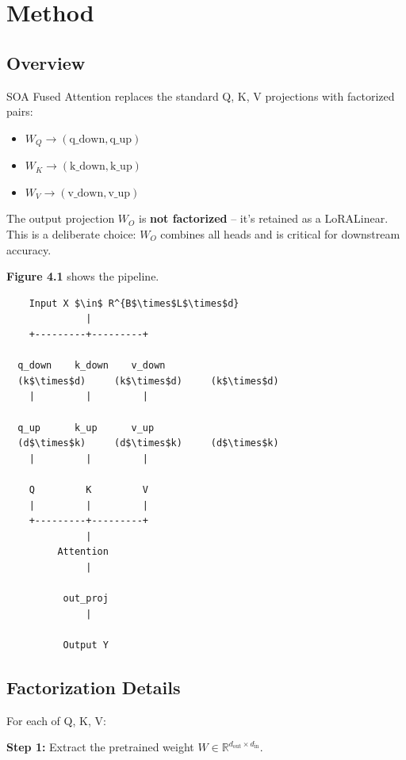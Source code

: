 \section{Method}

\subsection{Overview}

SOA Fused Attention replaces the standard Q, K, V projections with 
factorized pairs:

\begin{itemize}
\item $W_Q \to (\text{q\_down}, \text{q\_up})$
\item $W_K \to (\text{k\_down}, \text{k\_up})$
\item $W_V \to (\text{v\_down}, \text{v\_up})$

\end{itemize}
The output projection $W_O$ is \textbf{not factorized} -- it's retained as a 
LoRALinear. This is a deliberate choice: $W_O$ combines all heads and is 
critical for downstream accuracy.

\textbf{Figure 4.1} shows the pipeline.

\begin{lstlisting}
    Input X $\in$ R^{B$\times$L$\times$d}
              |
    +---------+---------+
                         
  q_down    k_down    v_down
  (k$\times$d)     (k$\times$d)     (k$\times$d)
    |         |         |
                         
  q_up      k_up      v_up
  (d$\times$k)     (d$\times$k)     (d$\times$k)
    |         |         |
                         
    Q         K         V
    |         |         |
    +---------+---------+
              |
         Attention
              |
               
          out_proj
              |
               
          Output Y
\end{lstlisting}

\subsection{Factorization Details}

For each of Q, K, V:

\textbf{Step 1:} Extract the pretrained weight $W \in \mathbb{R}^{d_\text{out} \times d_\text{in}}$.

